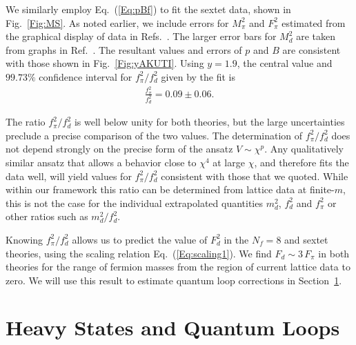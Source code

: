 \documentclass[a4paper,11pt]{article}
\newcommand{\beqs}{\begin{eqnarray}}
\newcommand{\eeqs}{\end{eqnarray}}
\begin{document}
We similarly employ Eq.~(\ref{Eq:pBf}) to fit the sextet data, shown in Fig.~\ref{Fig:MS}. As noted earlier, we include errors for $M_{\pi}^2$ and $F_{\pi}^2$ estimated from the graphical display of data in Refs.~\cite{FHKMNW,FHKMNW2,FHKNSW}. The larger error bars for $M_{d}^2$ are taken from graphs in Ref.~\cite{FHKMNW}. The resultant values and errors of $p$ and $B$ are consistent with those shown in Fig.~\ref{Fig:yAKUTI}. Using $y=1.9$, the central value and $99.73\%$ confidence interval for $f^2_\pi/f^2_d$ given by the fit is
\beqs
\frac{f^2_\pi}{f^2_d} = 0.09 \pm 0.06.
\label{Eq:RatioS}
\eeqs


The ratio $f_{\pi}^2/f_d^2$ is well below unity for both theories, but the large uncertainties preclude a precise comparison of the two values. The determination of $f_{\pi}^2 / f_d^2$ does not depend strongly on the precise form of the ansatz $V\sim\chi^p$.  Any qualitatively similar ansatz that allows a behavior close to $\chi^4$ at large $\chi$, and therefore fits the data well, will yield values for $f_{\pi}^2 / f_d^2$ consistent with those that we quoted. While within our framework this ratio can be determined from lattice data at finite-$m$, this is not the case for the individual extrapolated quantities $m_d^2$, $f_d^2$ and $f_{\pi}^2$ or other ratios such as $m^2_d/f_d^2$.

Knowing $f^2_\pi/f^2_d$ allows us to predict the value of $F^2_d$ in the $N_f=8$ and sextet theories, using the scaling relation Eq.~(\ref{Eq:scaling1}). We find $F_d\sim3\,F_\pi$ in both theories for the range of fermion masses from the region of current lattice data to zero. We will use this result to estimate quantum loop corrections in Section~\ref{Sec:loops}.




\section {Heavy States and Quantum Loops }
\label{Sec:loops}
\end{document}
